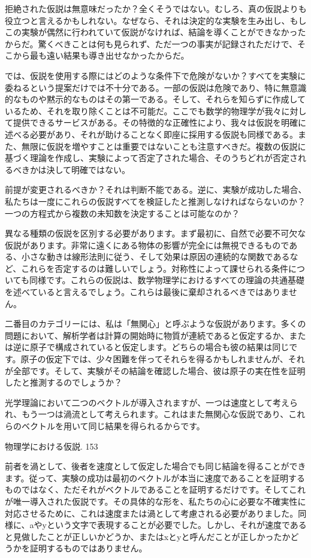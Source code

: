 \documentclass[a4paper,11pt,openany]{ltjsbook}
\begin{document}
拒絶された仮説は無意味だったか？全くそうではない。むしろ、真の仮説よりも役立つと言えるかもしれない。なぜなら、それは決定的な実験を生み出し、もしこの実験が偶然に行われていて仮説がなければ、結論を導くことができなかったからだ。驚くべきことは何も見られず、ただ一つの事実が記録されただけで、そこから最も遠い結果も導き出せなかったからだ。

では、仮説を使用する際にはどのような条件下で危険がないか？すべてを実験に委ねるという提案だけでは不十分である。一部の仮説は危険であり、特に無意識的なものや黙示的なものはその第一である。そして、それらを知らずに作成しているため、それを取り除くことは不可能だ。ここでも数学的物理学が我々に対して提供できるサービスがある。その特徴的な正確性により、我々は仮説を明確に述べる必要があり、それが助けることなく即座に採用する仮説も同様である。また、無限に仮説を増やすことは重要ではないことも注意すべきだ。複数の仮説に基づく理論を作成し、実験によって否定了された場合、そのうちどれが否定されるべきかは決して明確ではない。

前提が変更されるべきか？それは判断不能である。逆に、実験が成功した場合、私たちは一度にこれらの仮説すべてを検証したと推測しなければならないのか？一つの方程式から複数の未知数を決定することは可能なのか？

異なる種類の仮説を区別する必要があります。まず最初に、自然で必要不可欠な仮説があります。非常に遠くにある物体の影響が完全には無視できるものである、小さな動きは線形法則に従う、そして効果は原因の連続的な関数であるなど、これらを否定するのは難しいでしょう。対称性によって課せられる条件についても同様です。これらの仮説は、数学物理学におけるすべての理論の共通基礎を述べていると言えるでしょう。これらは最後に棄却されるべきではありません。

二番目のカテゴリーには、私は「無関心」と呼ぶような仮説があります。多くの問題において、解析学者は計算の開始時に物質が連続であると仮定するか、または逆に原子で構成されていると仮定します。どちらの場合も彼の結果は同じです。原子の仮定下では、少々困難を伴ってそれらを得るかもしれませんが、それが全部です。そして、実験がその結論を確認した場合、彼は原子の実在性を証明したと推測するのでしょうか？

光学理論において二つのベクトルが導入されますが、一つは速度として考えられ、もう一つは渦流として考えられます。これはまた無関心な仮説であり、これらのベクトルを用いて同じ結果を得られるからです。

物理学における仮説. 153


前者を渦として、後者を速度として仮定した場合でも同じ結論を得ることができます。従って、実験の成功は最初のベクトルが本当に速度であることを証明するものではなく、ただそれがベクトルであることを証明するだけです。そしてこれが唯一導入された仮説です。その具体的な形を、私たちの心に必要な不確実性に対応させるために、これは速度または渦として考慮される必要がありました。同様に、aやyという文字で表現することが必要でした。しかし、それが速度であると見做したことが正しいかどうか、またはxとyと呼んだことが正しかったかどうかを証明するものではありません。
\end{document}
